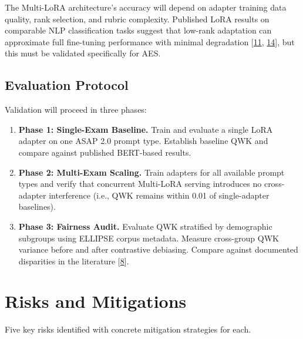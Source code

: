 \documentclass[12pt]{article}
\begin{document}
The Multi-LoRA architecture's accuracy will depend on adapter training data quality, rank selection, and rubric complexity. Published LoRA results on comparable NLP classification tasks suggest that low-rank adaptation can approximate full fine-tuning performance with minimal degradation [\hyperlink{ref11}{11}, \hyperlink{ref14}{14}], but this must be validated specifically for AES.

\subsection{Evaluation Protocol}

Validation will proceed in three phases:

\begin{enumerate}[leftmargin=*]
    \item \textbf{Phase 1: Single-Exam Baseline.} Train and evaluate a single LoRA adapter on one ASAP 2.0 prompt type. Establish baseline QWK and compare against published BERT-based results.

    \item \textbf{Phase 2: Multi-Exam Scaling.} Train adapters for all available prompt types and verify that concurrent Multi-LoRA serving introduces no cross-adapter interference (i.e., QWK remains within 0.01 of single-adapter baselines).

    \item \textbf{Phase 3: Fairness Audit.} Evaluate QWK stratified by demographic subgroups using ELLIPSE corpus metadata. Measure cross-group QWK variance before and after contrastive debiasing. Compare against documented disparities in the literature [\hyperlink{ref8}{8}].
\end{enumerate}

\section{Risks and Mitigations}

\begin{ataglance}
\singlespacing
Five key risks identified with concrete mitigation strategies for each.
\end{ataglance}
\end{document}
